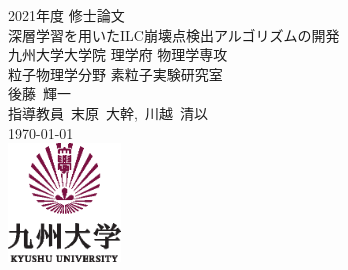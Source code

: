 \documentclass[12pt, openany]{jsbook}
\begin{document}
\begin{titlepage}
 \begin{center}
  {\Large 2021年度 修士論文} \\ 
  \vspace*{125pt}
  {\Large 深層学習を用いたILC崩壊点検出アルゴリズムの開発}\\[11pt]
  {\large 九州大学大学院 理学府 物理学専攻 \\ 粒子物理学分野 素粒子実験研究室} \\[15pt]
  \vspace{40pt}
  {\large  後藤\ 輝一 \\[1ex] 指導教員\ 末原\ 大幹,\ 川越\ 清以 } \\[1em]
  \today\\
 \vspace{100pt}
  \includegraphics[width=3cm]{Figure/1Introduction/KyushuUniversityLogo.eps}
 \end{center}
\end{titlepage}

\thispagestyle{empty}　\newpage

\thispagestyle{empty}　\newpage
\pagestyle{headings}
\tableofcontents
\listoffigures
\listoftables






%




\end{document}

